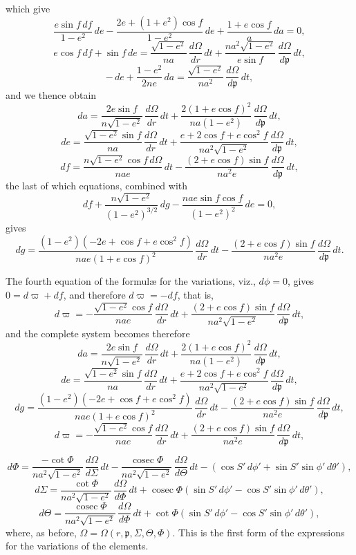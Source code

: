 \documentclass[11pt]{article}
\begin{document}
\bigskip
{} which give
\[
\frac{e\sin f\,df}{1-e^{2}}\,de - \frac{2e+(1+e^{2})\cos f}{1-e^{2}}\,de + \frac{1+e\cos f}{a}\,da = 0,
\]
\[
e\cos f\,df + \sin f\,de = \frac{\sqrt{1-e^{2}}}{na}\,\frac{d\Omega}{dr}\,dt + \frac{na^{2}\sqrt{1-e^{2}}}{e\sin f}\,\frac{d\Omega}{d\mathfrak{p}}\,dt,
\]
\[
-\,de + \frac{1-e^{2}}{2ne}\,da = \frac{\sqrt{1-e^{2}}}{na^{2}}\,\frac{d\Omega}{d\mathfrak{p}}\,dt,
\]
and we thence obtain
\[
da = \frac{2e\sin f}{n\sqrt{1-e^{2}}}\,\frac{d\Omega}{dr}\,dt + \frac{2(1+e\cos f)^{2}}{na(1-e^{2})}\,\frac{d\Omega}{d\mathfrak{p}}\,dt,
\]
\[
de = \frac{\sqrt{1-e^{2}}\sin f}{na}\,\frac{d\Omega}{dr}\,dt + \frac{e+2\cos f+e\cos^{2}f}{na^{2}\sqrt{1-e^{2}}}\,\frac{d\Omega}{d\mathfrak{p}}\,dt,
\]
\[
df = \frac{n\sqrt{1-e^{2}}\cos f\,d\Omega}{nae}\,dt - \frac{(2+e\cos f)\sin f}{na^{2}e}\,\frac{d\Omega}{d\mathfrak{p}}\,dt,
\]
the last of which equations, combined with
\[
df + \frac{n\sqrt{1-e^{2}}}{(1-e^{2})^{3/2}}\,dg - \frac{na e\sin f\cos f}{(1-e^{2})^{2}}\,de = 0,
\]
gives
\[
dg = \frac{(1-e^{2})(-2e+\cos f + e\cos^{2}f)}{nae(1+e\cos f)^{2}}\,\frac{d\Omega}{dr}\,dt - \frac{(2+e\cos f)\sin f}{na^{2}e}\,\frac{d\Omega}{d\mathfrak{p}}\,dt.
\]

\medskip
\noindent The fourth equation of the formul\ae{} for the variations, viz., $d\phi=0$, gives $0 = d\varpi + df$, and therefore $d\varpi = -df$, that is,
\[
d\varpi = -\frac{\sqrt{1-e^{2}}\cos f}{nae}\,\frac{d\Omega}{dr}\,dt + \frac{(2+e\cos f)\sin f}{na^{2}\sqrt{1-e^{2}}}\,\frac{d\Omega}{d\mathfrak{p}}\,dt,
\]
and the complete system becomes therefore
\[
da = \frac{2e\sin f}{n\sqrt{1-e^{2}}}\,\frac{d\Omega}{dr}\,dt + \frac{2(1+e\cos f)^{2}}{na(1-e^{2})}\,\frac{d\Omega}{d\mathfrak{p}}\,dt,
\]
\[
de = \frac{\sqrt{1-e^{2}}\sin f}{na}\,\frac{d\Omega}{dr}\,dt + \frac{e+2\cos f+e\cos^{2}f}{na^{2}\sqrt{1-e^{2}}}\,\frac{d\Omega}{d\mathfrak{p}}\,dt,
\]
\[
dg = \frac{(1-e^{2})(-2e+\cos f+e\cos^{2}f)}{nae(1+e\cos f)^{2}}\,\frac{d\Omega}{dr}\,dt - \frac{(2+e\cos f)\sin f}{na^{2}e}\,\frac{d\Omega}{d\mathfrak{p}}\,dt,
\]
\[
d\varpi = -\frac{\sqrt{1-e^{2}}\cos f}{nae}\,\frac{d\Omega}{dr}\,dt + \frac{(2+e\cos f)\sin f}{na^{2}e}\,\frac{d\Omega}{d\mathfrak{p}}\,dt,
\]

\bigskip
{}
\[
d\Phi = \frac{-\cot\Phi}{na^{2}\sqrt{1-e^{2}}}\,\frac{d\Omega}{d\Sigma}\,dt - \frac{\operatorname{cosec}\Phi}{na^{2}\sqrt{1-e^{2}}}\,\frac{d\Omega}{d\Theta}\,dt - (\cos S'\,d\phi' + \sin S'\sin\phi'\,d\theta'),
\]
\[
d\Sigma = \frac{\cot\Phi}{na^{2}\sqrt{1-e^{2}}}\,\frac{d\Omega}{d\Phi}\,dt + \operatorname{cosec}\Phi(\sin S'\,d\phi' - \cos S'\sin\phi'\,d\theta'),
\]
\[
d\Theta = \frac{\operatorname{cosec}\Phi}{na^{2}\sqrt{1-e^{2}}}\,\frac{d\Omega}{d\Phi}\,dt + \cot\Phi(\sin S'\,d\phi' - \cos S'\sin\phi'\,d\theta'),
\]
where, as before, $\Omega = \Omega(r,\mathfrak{p},\Sigma,\Theta,\Phi)$. This is the first form of the expressions for the variations of the elements.
\end{document}

